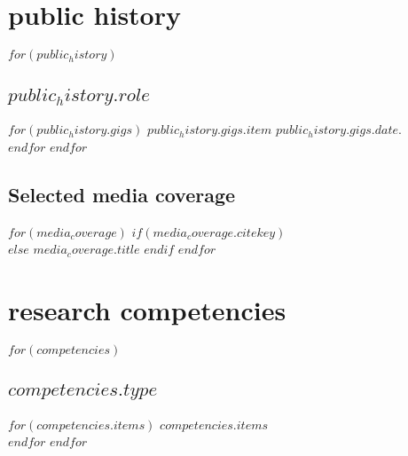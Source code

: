 \documentclass[11pt, a4paper]{article}
\begin{document}
\section{public history}

$for(public_history)$
\subsection{$public_history.role$}
$for(public_history.gigs)$
$public_history.gigs.item$ $public_history.gigs.date$.\\[.15cm]
$endfor$
$endfor$
\subsection{Selected media coverage}

$for(media_coverage)$
$if(media_coverage.citekey)$
\\
$else$
$media_coverage.title$
$endif$
$endfor$




\section{research competencies}
$for(competencies)$
\subsection{$competencies.type$}
$for(competencies.items)$
$competencies.items$\\[.15cm]
$endfor$
$endfor$
\end{document}
